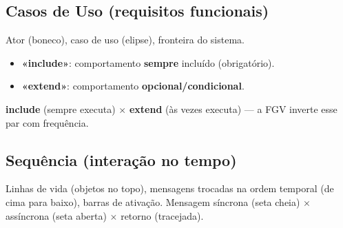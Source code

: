 \subsection{Casos de Uso (requisitos funcionais)}

Ator (boneco), caso de uso (elipse), fronteira do sistema.

\begin{itemize}
\item \textbf{«include»}: comportamento \textbf{sempre} incluído
(obrigatório).
\item \textbf{«extend»}: comportamento \textbf{opcional/condicional}.
\end{itemize}

\begin{pegadinha}
\textbf{include} (sempre executa) $\times$ \textbf{extend} (às vezes executa)
--- a FGV inverte esse par com frequência.
\end{pegadinha}

\subsection{Sequência (interação no tempo)}

Linhas de vida (objetos no topo), mensagens trocadas na ordem temporal (de
cima para baixo), barras de ativação. Mensagem síncrona (seta cheia) $\times$
assíncrona (seta aberta) $\times$ retorno (tracejada).

